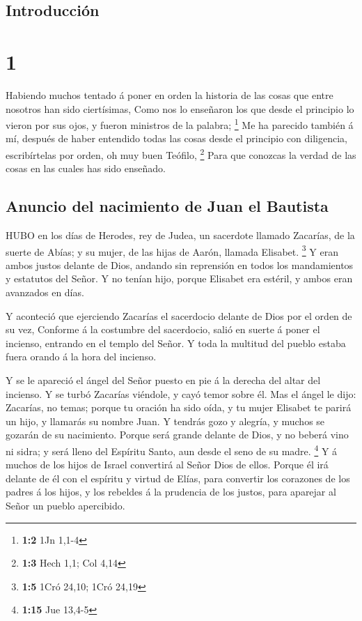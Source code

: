\hypertarget{introducciuxf3n}{%
\subsection{Introducción}\label{introducciuxf3n}}

\hypertarget{section}{%
\section{1}\label{section}}

 Habiendo muchos tentado á poner en orden la historia de las
cosas que entre nosotros han sido ciertísimas,  Como nos lo
enseñaron los que desde el principio lo vieron por sus ojos, y fueron
ministros de la palabra; \footnote{\textbf{1:2} 1Jn 1,1-4} 
Me ha parecido también á mí, después de haber entendido todas las cosas
desde el principio con diligencia, escribírtelas por orden, oh muy buen
Teófilo, \footnote{\textbf{1:3} Hech 1,1; Col 4,14}  Para
que conozcas la verdad de las cosas en las cuales has sido enseñado.

\hypertarget{anuncio-del-nacimiento-de-juan-el-bautista}{%
\subsection{Anuncio del nacimiento de Juan el
Bautista}\label{anuncio-del-nacimiento-de-juan-el-bautista}}

 HUBO en los días de Herodes, rey de Judea, un sacerdote
llamado Zacarías, de la suerte de Abías; y su mujer, de las hijas de
Aarón, llamada Elisabet. \footnote{\textbf{1:5} 1Cró 24,10; 1Cró 24,19}
 Y eran ambos justos delante de Dios, andando sin reprensión
en todos los mandamientos y estatutos del Señor.  Y no
tenían hijo, porque Elisabet era estéril, y ambos eran avanzados en
días.

 Y aconteció que ejerciendo Zacarías el sacerdocio delante
de Dios por el orden de su vez,  Conforme á la costumbre del
sacerdocio, salió en suerte á poner el incienso, entrando en el templo
del Señor.  Y toda la multitud del pueblo estaba fuera
orando á la hora del incienso.

 Y se le apareció el ángel del Señor puesto en pie á la
derecha del altar del incienso.  Y se turbó Zacarías
viéndole, y cayó temor sobre él.  Mas el ángel le dijo:
Zacarías, no temas; porque tu oración ha sido oída, y tu mujer Elisabet
te parirá un hijo, y llamarás su nombre Juan.  Y tendrás
gozo y alegría, y muchos se gozarán de su nacimiento. 
Porque será grande delante de Dios, y no beberá vino ni sidra; y será
lleno del Espíritu Santo, aun desde el seno de su madre. \footnote{\textbf{1:15}
  Jue 13,4-5}  Y á muchos de los hijos de Israel convertirá
al Señor Dios de ellos.  Porque él irá delante de él con el
espíritu y virtud de Elías, para convertir los corazones de los padres á
los hijos, y los rebeldes á la prudencia de los justos, para aparejar al
Señor un pueblo apercibido.

